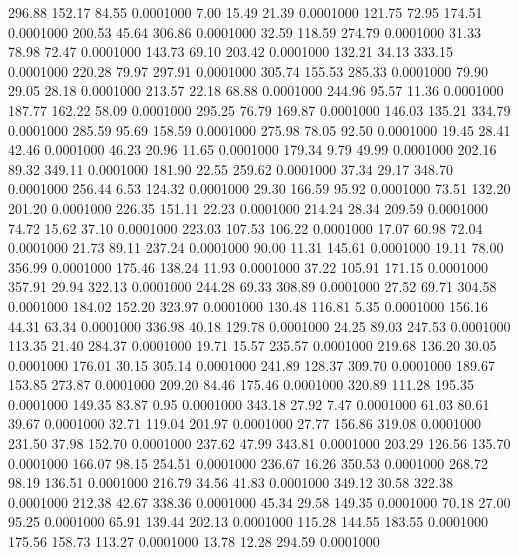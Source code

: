  296.88  152.17   84.55   0.0001000
   7.00   15.49   21.39   0.0001000
 121.75   72.95  174.51   0.0001000
 200.53   45.64  306.86   0.0001000
  32.59  118.59  274.79   0.0001000
  31.33   78.98   72.47   0.0001000
 143.73   69.10  203.42   0.0001000
 132.21   34.13  333.15   0.0001000
 220.28   79.97  297.91   0.0001000
 305.74  155.53  285.33   0.0001000
  79.90   29.05   28.18   0.0001000
 213.57   22.18   68.88   0.0001000
 244.96   95.57   11.36   0.0001000
 187.77  162.22   58.09   0.0001000
 295.25   76.79  169.87   0.0001000
 146.03  135.21  334.79   0.0001000
 285.59   95.69  158.59   0.0001000
 275.98   78.05   92.50   0.0001000
  19.45   28.41   42.46   0.0001000
  46.23   20.96   11.65   0.0001000
 179.34    9.79   49.99   0.0001000
 202.16   89.32  349.11   0.0001000
 181.90   22.55  259.62   0.0001000
  37.34   29.17  348.70   0.0001000
 256.44    6.53  124.32   0.0001000
  29.30  166.59   95.92   0.0001000
  73.51  132.20  201.20   0.0001000
 226.35  151.11   22.23   0.0001000
 214.24   28.34  209.59   0.0001000
  74.72   15.62   37.10   0.0001000
 223.03  107.53  106.22   0.0001000
  17.07   60.98   72.04   0.0001000
  21.73   89.11  237.24   0.0001000
  90.00   11.31  145.61   0.0001000
  19.11   78.00  356.99   0.0001000
 175.46  138.24   11.93   0.0001000
  37.22  105.91  171.15   0.0001000
 357.91   29.94  322.13   0.0001000
 244.28   69.33  308.89   0.0001000
  27.52   69.71  304.58   0.0001000
 184.02  152.20  323.97   0.0001000
 130.48  116.81    5.35   0.0001000
 156.16   44.31   63.34   0.0001000
 336.98   40.18  129.78   0.0001000
  24.25   89.03  247.53   0.0001000
 113.35   21.40  284.37   0.0001000
  19.71   15.57  235.57   0.0001000
 219.68  136.20   30.05   0.0001000
 176.01   30.15  305.14   0.0001000
 241.89  128.37  309.70   0.0001000
 189.67  153.85  273.87   0.0001000
 209.20   84.46  175.46   0.0001000
 320.89  111.28  195.35   0.0001000
 149.35   83.87    0.95   0.0001000
 343.18   27.92    7.47   0.0001000
  61.03   80.61   39.67   0.0001000
  32.71  119.04  201.97   0.0001000
  27.77  156.86  319.08   0.0001000
 231.50   37.98  152.70   0.0001000
 237.62   47.99  343.81   0.0001000
 203.29  126.56  135.70   0.0001000
 166.07   98.15  254.51   0.0001000
 236.67   16.26  350.53   0.0001000
 268.72   98.19  136.51   0.0001000
 216.79   34.56   41.83   0.0001000
 349.12   30.58  322.38   0.0001000
 212.38   42.67  338.36   0.0001000
  45.34   29.58  149.35   0.0001000
  70.18   27.00   95.25   0.0001000
  65.91  139.44  202.13   0.0001000
 115.28  144.55  183.55   0.0001000
 175.56  158.73  113.27   0.0001000
  13.78   12.28  294.59   0.0001000
